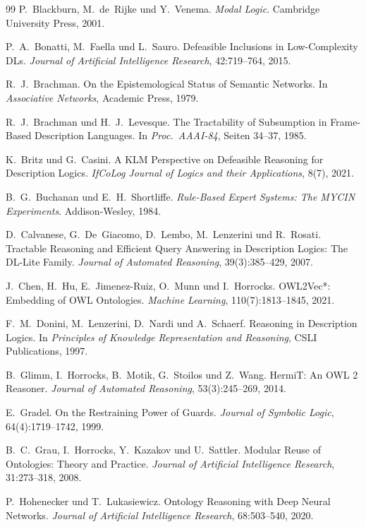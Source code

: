 ﻿\documentclass[a4paper,12pt]{article}
\theoremstyle{definition}
\theoremstyle{plain}
\theoremstyle{remark}
\begin{document}
\begin{thebibliography}{99}
P.~Blackburn, M.~de~Rijke und Y.~Venema.
\textit{Modal Logic}.
Cambridge University Press, 2001.

P.~A.~Bonatti, M.~Faella und L.~Sauro.
Defeasible Inclusions in Low-Complexity DLs.
\textit{Journal of Artificial Intelligence Research},
42:719--764, 2015.

R.~J.~Brachman.
On the Epistemological Status of Semantic Networks.
In \textit{Associative Networks}, Academic Press, 1979.

R.~J.~Brachman und H.~J.~Levesque.
The Tractability of Subsumption in Frame-Based
Description Languages.
In \textit{Proc.\ AAAI-84}, Seiten 34--37, 1985.

K.~Britz und G.~Casini.
A KLM Perspective on Defeasible Reasoning for Description Logics.
\textit{IfCoLog Journal of Logics and their Applications},
8(7), 2021.

B.~G.~Buchanan und E.~H.~Shortliffe.
\textit{Rule-Based Expert Systems: The MYCIN Experiments}.
Addison-Wesley, 1984.

D.~Calvanese, G.~De~Giacomo, D.~Lembo, M.~Lenzerini und R.~Rosati.
Tractable Reasoning and Efficient Query Answering in Description Logics:
The DL-Lite Family.
\textit{Journal of Automated Reasoning}, 39(3):385--429, 2007.

J.~Chen, H.~Hu, E.~Jimenez-Ruiz, O.~Munn und I.~Horrocks.
OWL2Vec*: Embedding of OWL Ontologies.
\textit{Machine Learning}, 110(7):1813--1845, 2021.

F.~M.~Donini, M.~Lenzerini, D.~Nardi und A.~Schaerf.
Reasoning in Description Logics.
In \textit{Principles of Knowledge Representation and Reasoning},
CSLI Publications, 1997.

B.~Glimm, I.~Horrocks, B.~Motik, G.~Stoilos und Z.~Wang.
HermiT: An OWL 2 Reasoner.
\textit{Journal of Automated Reasoning}, 53(3):245--269, 2014.

E.~Gradel.
On the Restraining Power of Guards.
\textit{Journal of Symbolic Logic}, 64(4):1719--1742, 1999.

B.~C.~Grau, I.~Horrocks, Y.~Kazakov und U.~Sattler.
Modular Reuse of Ontologies: Theory and Practice.
\textit{Journal of Artificial Intelligence Research},
31:273--318, 2008.

P.~Hohenecker und T.~Lukasiewicz.
Ontology Reasoning with Deep Neural Networks.
\textit{Journal of Artificial Intelligence Research},
68:503--540, 2020.


\end{thebibliography}
\end{document}
